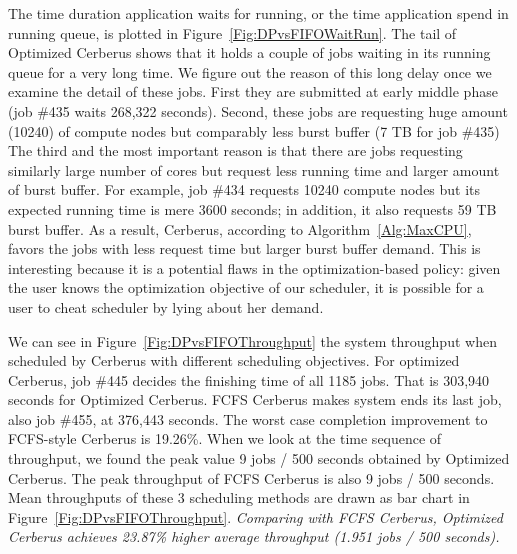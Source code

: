 The time duration application waits for running,
or the time application spend in running queue,
is plotted in Figure~\ref{Fig:DPvsFIFOWaitRun}.
The tail of Optimized Cerberus shows that it holds a couple of jobs waiting
in its running queue for a very long time.
We figure out the reason of this long delay once we examine the detail of these jobs.
First they are submitted at early middle phase (job \#435 waits 268,322 seconds).
Second, these jobs are requesting huge amount (10240) of compute nodes
but comparably less burst buffer (7 TB for job \#435)
The third and the most important reason is that there are jobs requesting similarly
large number of cores but request less running time and larger amount of burst buffer.
For example, job \#434 requests 10240 compute nodes
but its expected running time is mere 3600 seconds;
in addition, it also requests 59 TB burst buffer.
As a result, Cerberus, according to Algorithm~\ref{Alg:MaxCPU}, %
favors the jobs with less request time but larger burst buffer demand.
This is interesting because it is a potential flaws in the optimization-based policy:
given the user knows the optimization objective of our scheduler,
it is possible for a user to cheat scheduler by lying about her demand.


We can see in Figure~\ref{Fig:DPvsFIFOThroughput} the system throughput
when scheduled by Cerberus with different scheduling objectives.
For optimized Cerberus, job \#445 decides the finishing time of all 1185 jobs.
That is 303,940 seconds for Optimized Cerberus.
FCFS Cerberus makes system ends its last job, also job \#455, at 376,443 seconds.
The worst case completion improvement to FCFS-style Cerberus is 19.26\%.
When we look at the time sequence of throughput,
we found the peak value 9 jobs / 500 seconds obtained by Optimized Cerberus.
The peak throughput of FCFS Cerberus is also 9 jobs / 500 seconds.
Mean throughputs of these 3 scheduling methods are drawn
as bar chart in Figure~\ref{Fig:DPvsFIFOThroughput}.
\textit{Comparing with FCFS Cerberus, Optimized Cerberus achieves
23.87\% higher average throughput (1.951 jobs / 500 seconds).}



